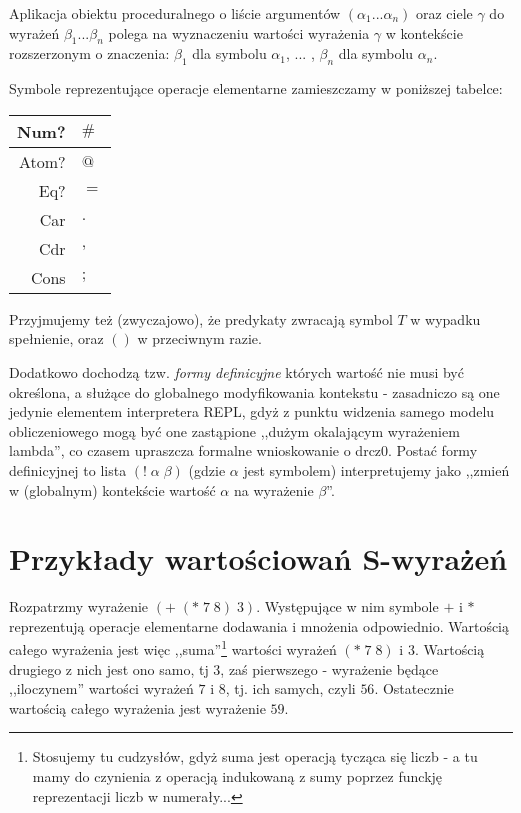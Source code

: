 \documentclass[a4paper]{article}
\begin{document}
Aplikacja obiektu proceduralnego o liście argumentów $(\alpha_1 ... \alpha_n)$ oraz ciele $\gamma$
do wyrażeń $\beta_1 ... \beta_n$ polega na wyznaczeniu wartości wyrażenia $\gamma$ w kontekście rozszerzonym
o znaczenia: $\beta_1$ dla symbolu $\alpha_1$, ... , $\beta_n$ dla symbolu $\alpha_n$.

Symbole reprezentujące operacje elementarne zamieszczamy w poniższej tabelce:


\begin{tabular} {r|l}
Num? & $\#$\\
\hline
Atom? & $@$ \\
\hline
Eq? & $=$\\
\hline
Car & $.$ \\
\hline
Cdr & $,$ \\
\hline
Cons & $;$ \\
\end{tabular}

Przyjmujemy też (zwyczajowo), że predykaty zwracają symbol $T$ w wypadku spełnienie, oraz $()$ w przeciwnym razie.

Dodatkowo dochodzą tzw. \emph{formy definicyjne} których wartość nie musi być określona, a służące do
globalnego modyfikowania kontekstu - zasadniczo są one jedynie elementem interpretera REPL, gdyż z punktu
widzenia samego modelu obliczeniowego mogą być one zastąpione ,,dużym okalającym wyrażeniem lambda'', co
czasem upraszcza formalne wnioskowanie o drcz0. Postać formy definicyjnej to lista $(!\; \alpha \;\beta)$ (gdzie
$\alpha$ jest symbolem) interpretujemy jako ,,zmień w (globalnym) kontekście wartość $\alpha$ na wyrażenie $\beta$''.


\section{Przykłady wartościowań S-wyrażeń}

Rozpatrzmy wyrażenie $(+ \; (* \; 7 \; 8) \; 3)$. Występujące w nim symbole $+$ i $*$ reprezentują operacje elementarne
dodawania i mnożenia odpowiednio. Wartością całego wyrażenia jest więc ,,suma''\footnote{Stosujemy tu cudzysłów,
gdyż suma jest operacją tycząca się liczb - a tu mamy do czynienia z operacją indukowaną z sumy poprzez funckję
reprezentacji liczb w numerały...} wartości wyrażeń $(* \; 7 \; 8)$ i $3$. Wartością drugiego z nich jest ono samo, tj $3$,
zaś pierwszego - wyrażenie będące ,,iloczynem'' wartości wyrażeń $7$ i $8$, tj. ich samych, czyli $56$.
Ostatecznie wartością całego wyrażenia jest wyrażenie $59$.
\end{document}
